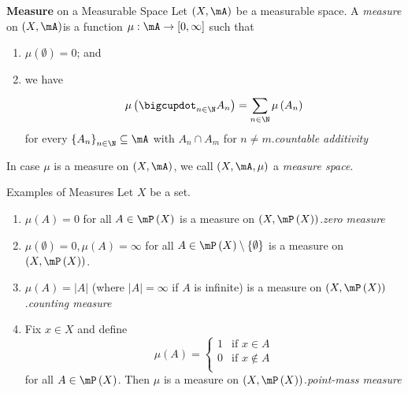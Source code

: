 \documentclass[pmath451]{subfiles}
\begin{document}
    \begin{definition}{\textbf{Measure} on a Measurable Space}
        Let $\left( X,\mA \right)$ be a measurable space. A \emph{measure} on $\left( X,\mA \right)$\footnotemark is a function $\mu:\mA\to\left[ 0,\infty \right]$ such that
        \begin{enumerate}
            \item $\mu\left( \emptyset \right) = 0$; and
            \item we have 
                \begin{equation*}
                    \mu\left( \bigcupdot^{}_{n\in\N} A_n \right) = \sum^{}_{n\in\N} \mu\left( A_n \right)
                \end{equation*}
                for every $\left\lbrace A_n \right\rbrace^{}_{n\in\N}\subseteq\mA$ with $A_n\cap A_m$ for $n\neq m$.\hfill\textit{countable additivity}
        \end{enumerate}
        In case $\mu$ is a measure on $\left( X,\mA \right)$, we call $\left( X,\mA,\mu \right)$ a \emph{measure space}.
        
        \noindent
        \begin{minipage}{\textwidth}
        \end{minipage}
    \end{definition}
    
    \begin{example}{Examples of Measures}
        Let $X$ be a set.
        \begin{enumerate}
            \item $\mu\left( A \right) = 0$ for all $A\in\mP\left( X \right)$ is a measure on $\left( X,\mP\left( X \right) \right)$.\hfill\textit{zero measure}
            \item $\mu\left( \emptyset \right) = 0, \mu\left( A \right) = \infty$ for all $A\in\mP\left( X \right)\setminus \left\lbrace \emptyset \right\rbrace$ is a measure on $\left( X,\mP\left( X \right) \right)$.
            \item $\mu\left( A \right) = \left| A \right|$ (where $\left| A \right|=\infty$ if $A$ is infinite) is a measure on $\left( X,\mP\left( X \right) \right)$.\hfill\textit{counting measure}
            \item Fix $x\in X$ and define
                \begin{equation*}
                    \mu\left( A \right) =
                    \begin{cases} 
                        1 & \text{if $x\in A$} \\
                        0 & \text{if $x\notin A$} \\
                    \end{cases}
                \end{equation*}
                for all $A\in\mP\left( X \right)$. Then $\mu$ is a measure on $\left( X,\mP\left( X \right) \right)$.\hfill\textit{point-mass measure}
        \end{enumerate}
    \end{example}
\end{document}
